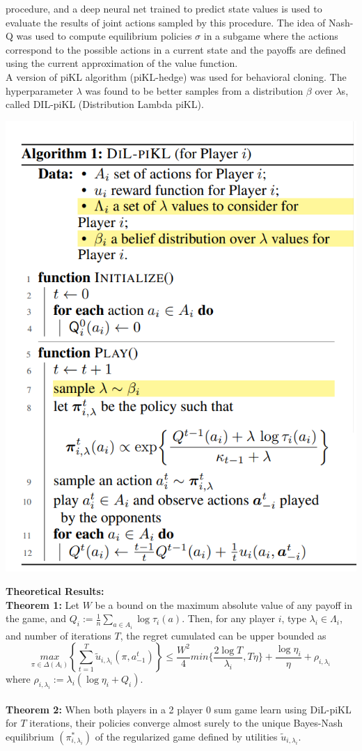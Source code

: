\documentclass[12pt]{article}
\begin{document}
procedure, and a deep neural net trained to predict state values is used to evaluate the results of
joint actions sampled by this procedure. The idea of Nash-Q was used to compute
equilibrium policies $\sigma$ in a subgame where the actions correspond to the possible actions in a current
state and the payoffs are defined using the current approximation of the value function.\\
A version of piKL algorithm (piKL-hedge) was used for behavioral cloning. The hyperparameter $\lambda$ was found to be better samples from a distribution $\beta$ over $\lambda$s, called DIL-piKL (Distribution Lambda piKL).
\begin{center}
  \includegraphics*{fig21.png}
\end{center}
\textbf{Theoretical Results:}\\
\textbf{Theorem 1:} Let $W$ be a bound on the maximum absolute value of any payoff in the game, and $Q_i:= \tfrac{1}{n}\sum_{a\in A_i}\log \tau_i(a)$. Then, for any player $i$, type $\lambda_i \in \Lambda_i$, and number of iterations $T$, the regret cumulated can be upper bounded as
\[\underset{\pi\in\Delta(A_i)}{max}\left\{\sum_{t=1}^{T}\tilde{u}_{i,\lambda_i}(\pi,a^t_{-1})\right\}\leq \dfrac{W^2}{4}min\{\dfrac{2\log T}{\lambda_i},T\eta\}+\dfrac{\log \eta_i}{\eta}+\rho_{i,\lambda_i}\]
where $\rho_{i,\lambda_i}:=\lambda_i(\log \eta_i+Q_i)$.\\
\\
\textbf{Theorem 2:} When both players in a
2 player 0 sum game learn using DiL-piKL for $T$ iterations, their policies converge almost surely to the unique
Bayes-Nash equilibrium $(\pi^*_{i,\lambda_i})$ of the regularized game defined by utilities $\tilde{u}_{i,\lambda_i}$.\\
\end{document}
